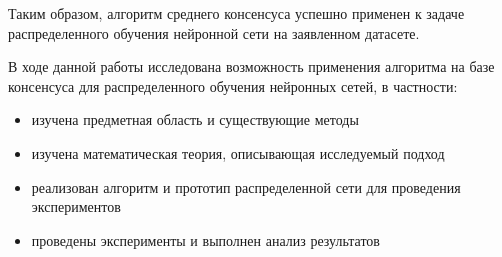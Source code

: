 \documentclass[a4paper,article,14pt]{extarticle}
\begin{document}
Таким образом, алгоритм среднего консенсуса успешно применен к задаче распределенного обучения нейронной сети на заявленном датасете.

\pagebreak
{}
В ходе данной работы исследована возможность применения алгоритма на базе консенсуса для распределенного обучения нейронных сетей, в частности:

\begin{itemize}
  \item изучена предметная область и существующие методы
  \item изучена математическая теория, описывающая исследуемый подход
  \item реализован алгоритм и прототип распределенной сети для проведения экспериментов
  \item проведены эксперименты и выполнен анализ результатов
\end{itemize}
\pagebreak
\end{document}
